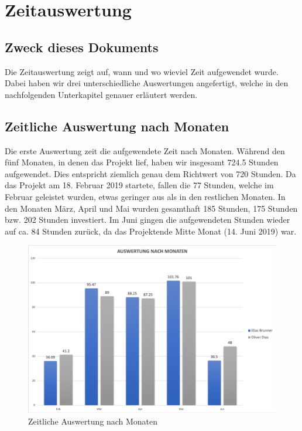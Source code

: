\section{Zeitauswertung}

\subsection{Zweck dieses Dokuments}
Die Zeitauswertung zeigt auf, wann und wo wieviel Zeit aufgewendet wurde. Dabei haben wir drei unterschiedliche Auswertungen angefertigt, welche in den nachfolgenden Unterkapitel genauer erläutert werden.

\subsection{Zeitliche Auswertung nach Monaten}
Die erste Auswertung zeit die aufgewendete Zeit nach Monaten. 
Während den fünf Monaten, in denen das Projekt lief, haben wir insgesamt 724.5 Stunden aufgewendet. Dies entspricht ziemlich genau dem Richtwert von 720 Stunden. 
Da das Projekt am 18. Februar 2019 startete, fallen die 77 Stunden, welche im Februar geleistet wurden, etwas geringer aus als in den restlichen Monaten. In den Monaten März, April und Mai wurden gesamthaft 185 Stunden, 175 Stunden bzw. 202 Stunden investiert. Im Juni gingen die aufgewendeten Stunden wieder auf ca. 84 Stunden zurück, da das Projektende Mitte Monat (14. Juni 2019) war.

\begin{figure}[h]
  \centering
  \includegraphics[width=1\linewidth]{./img/zeitauswertung/ZeitauswertungMonate}
  \caption{Zeitliche Auswertung nach Monaten}
  \label{fig:comparison-month}
\end{figure}

